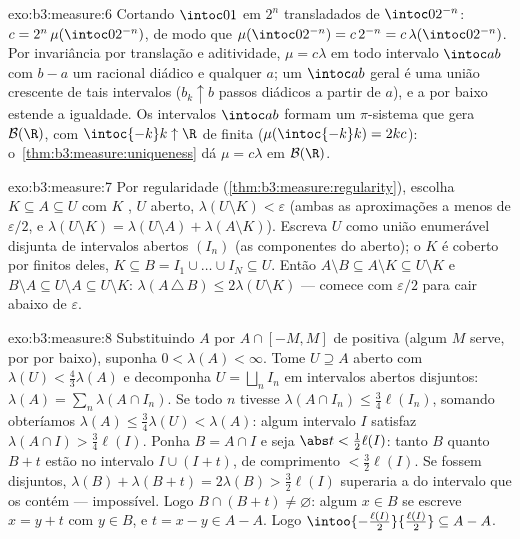 \begin{solution}{exo:b3:measure:6}
Cortando $\intoc01$ em $2^n$ transladados de $\intoc0{2^{-n}}$:
$c = 2^n\,\mu(\intoc0{2^{-n}})$, de modo que $\mu(\intoc0{2^{-n}}) =
c\,2^{-n} = c\,\lambda(\intoc0{2^{-n}})$. Por invariância
por translação e aditividade, $\mu = c\lambda$ em todo intervalo
$\intoc ab$ com $b - a$ um racional diádico e qualquer $a$; um
$\intoc ab$ geral é uma união crescente de tais intervalos
($b_k \uparrow b$ passos diádicos a partir de $a$), e a  por
baixo estende a igualdade. Os intervalos $\intoc ab$ formam um
$\pi$-sistema que gera $\mathcal B(\R)$, com $\intoc{-k}k
\uparrow \R$ de  finita ($\mu(\intoc{-k}k) = 2kc$):
o~\cref{thm:b3:measure:uniqueness} dá $\mu = c\lambda$ em
$\mathcal B(\R)$.
\end{solution}

\begin{solution}{exo:b3:measure:7}
Por regularidade (\cref{thm:b3:measure:regularity}), escolha $K
\subseteq A \subseteq U$ com $K$ , $U$ aberto,
$\lambda(U\setminus K) < \varepsilon$ (ambas as aproximações
a menos de $\varepsilon/2$, e $\lambda(U \setminus K) =
\lambda(U\setminus A) + \lambda(A \setminus K)$). Escreva $U$ como
união enumerável disjunta de intervalos abertos $(I_n)$ (as
componentes do aberto); o  $K$ é coberto por
finitos deles, $K \subseteq B = I_1\cup\dots\cup I_N \subseteq
U$. Então $A \setminus B \subseteq A\setminus K \subseteq
U\setminus K$ e $B \setminus A \subseteq U \setminus A
\subseteq U\setminus K$:
$\lambda(A\,\triangle\,B) \leq 2\lambda(U\setminus K)$ ---
comece com $\varepsilon/2$ para cair abaixo de $\varepsilon$.
\end{solution}

\begin{solution}{exo:b3:measure:8}
Substituindo $A$ por $A \cap [-M, M]$ de  positiva (algum $M$
serve, por  por baixo), suponha $0 < \lambda(A) <
\infty$. Tome $U \supseteq A$ aberto com $\lambda(U) <
\frac43\lambda(A)$ e decomponha $U = \bigsqcup_nI_n$ em
intervalos abertos disjuntos: $\lambda(A) = \sum_n\lambda(A\cap
I_n)$. Se todo $n$ tivesse $\lambda(A\cap I_n) \leq
\frac34\ell(I_n)$, somando obteríamos $\lambda(A) \leq
\frac34\lambda(U) < \lambda(A)$: algum intervalo $I$ satisfaz
$\lambda(A\cap I) > \frac34\ell(I)$. Ponha $B = A \cap I$ e seja
$\abs t < \frac12\ell(I)$: tanto $B$ quanto $B + t$ estão no
intervalo $I \cup (I + t)$, de comprimento $< \frac32\ell(I)$. Se
fossem disjuntos, $\lambda(B) + \lambda(B + t) = 2\lambda(B)
> \frac32\ell(I)$ superaria a  do intervalo que os contém
--- impossível. Logo $B \cap (B + t) \neq \varnothing$:
algum $x \in B$ se escreve $x = y + t$ com $y \in B$, e $t = x -
y \in A - A$.
Logo $\intoo{-\frac{\ell(I)}2}{\frac{\ell(I)}2} \subseteq A -
A$.
\end{solution}

